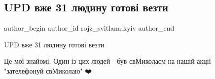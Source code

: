  
 
 
 
 
 
\subsection{UPD вже 31 людину готові везти}
\label{sec:28_02_2022.fb.rojz_svitlana.kyiv.3.upd}
 
\ifcmt
 author_begin
   author_id rojz_svitlana.kyiv
 author_end
\fi

UPD вже 31 людину готові везти

Це мої знайомі. Один із цих людей - був свМиколаєм на нашій акції "зателефонуй
свМиколаю" ❤️

